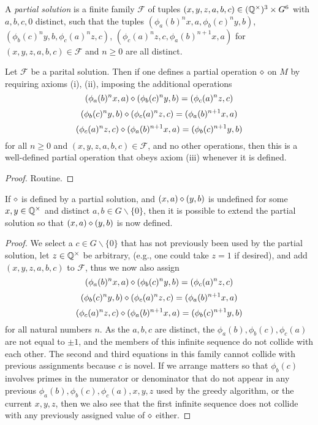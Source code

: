 \begin{definition}\label{partial-1323} A \emph{partial solution} is a finite family ${\mathcal F}$ of tuples $(x,y,z,a,b,c) \in (\mathbb{Q}^\times)^3 \times G^6$ with $a,b,c,0$ distinct, such that the tuples
$(\phi_a(b)^n x,a, \phi_b(c)^n y,b)$, $(\phi_b(c)^n y,b,\phi_c(a)^n z,c)$, $(\phi_c(a)^n z,c,\phi_a(b)^{n+1} x, a)$ for $(x,y,z,a,b,c) \in {\mathcal F}$ and $n \geq 0$ are all distinct.
\end{definition}

\begin{lemma}[Soundness]\label{partial-1323-sound}  Let ${\mathcal F}$ be a parital solution.  Then if one defines a partial operation $\diamond$ on $M$ by requiring axioms (i), (ii), imposing the additional operations
$$ (\phi_a(b)^n x,a) \diamond (\phi_b(c)^n y,b) = (\phi_c(a)^n z,c)$$
$$ (\phi_b(c)^n y,b) \diamond (\phi_c(a)^n z,c) = (\phi_a(b)^{n+1} x, a)$$
$$ (\phi_c(a)^n z,c) \diamond (\phi_a(b)^{n+1} x, a) = (\phi_b(c)^{n+1} y,b)$$
for all $n \geq 0$ and $(x,y,z,a,b,c) \in {\mathcal F}$, and no other operations, then this is a well-defined partial operation that obeys axiom (iii) whenever it is defined.
\end{lemma}

\begin{proof} Routine.
\end{proof}

\begin{lemma}\label{greedy-1323}  If $\diamond$ is defined by a partial solution, and $(x,a) \diamond (y,b)$ is undefined for some $x,y \in \mathbb{Q}^\times$ and distinct $a,b \in G \backslash \{0\}$, then it is possible to extend the partial solution so that $(x,a) \diamond (y,b)$ is now defined.
\end{lemma}

\begin{proof} We select a $c \in G \backslash \{0\}$ that has not previously been used by the partial solution, let $z \in \mathbb{Q}^\times$ be arbitrary, (e.g., one could take $z=1$ if desired), and add $(x,y,z,a,b,c)$ to ${\mathcal F}$, thus we now also assign
$$ (\phi_a(b)^n x,a) \diamond (\phi_b(c)^n y,b) = (\phi_c(a)^n z,c)$$
$$ (\phi_b(c)^n y,b) \diamond (\phi_c(a)^n z,c) = (\phi_a(b)^{n+1} x, a)$$
$$ (\phi_c(a)^n z,c) \diamond (\phi_a(b)^{n+1} x, a) = (\phi_b(c)^{n+1} y,b)$$
for all natural numbers $n$.  As the $a,b,c$ are distinct, the $\phi_a(b), \phi_b(c), \phi_c(a)$ are not equal to $\pm 1$, and the members of this infinite sequence do not collide with each other.  The second and third equations in this family cannot collide with previous assignments because $c$ is novel.  If we arrange matters so that $\phi_b(c)$ involves primes in the numerator or denominator that do not appear in any previous $\phi_a(b), \phi_b(c), \phi_c(a), x, y, z$ used by the greedy algorithm, or the current $x,y,z$, then we also see that the first infinite sequence does not collide with any previously assigned value of $\diamond$ either.
\end{proof}


